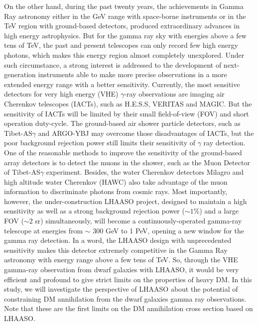 \documentclass[12pt,prd,showpacs,amsmath,amssymb,aps,floats,floatfix,nofootinbib]{revtex4-1}
\begin{document}
On the other hand, during the past twenty years, the achievements in Gamma Ray astronomy either in the GeV range with space-borne instruments or in the TeV region with ground-based detectors, produced extraordinary advances in high energy astrophysics. But for the gamma ray sky with energies above a few tens of TeV, the past and present telescopes can only record few high energy photons, which makes this energy region almost completely unexplored.
Under such circumstance, a strong interest is addressed to the development of next-generation instruments able to make more precise observations in a more extended energy range with a better sensitivity.
Currently, the most sensitive detectors for very high energy (VHE) $\gamma$-ray observations are imaging air Cherenkov telescopes (IACTs), such as H.E.S.S, VERITAS and MAGIC. But the sensitivity of IACTs will be limited by their small field-of-view (FOV) and short operation duty-cycle. The ground-based air shower particle detectors, such as Tibet-AS$\gamma$ and ARGO-YBJ may overcome those disadvantages of IACTs, but the poor background rejection power still limits their sensitivity of $\gamma$ ray detection. One of the reasonable methods to improve the sensitivity of the ground-based array detectors is to detect the muons in the shower, such as the Muon Detector of Tibet-AS$\gamma$ experiment. Besides, the water Cherenkov detectors Milagro and high altitude water Cherenkov (HAWC) also take advantage of the muon information to discriminate photons from cosmic rays.
Most importantly, however, the under-construction LHAASO project, designed to maintain a high sensitivity as well as a strong background rejection power ($\sim1\%$) and a large FOV ($\sim$2 sr) simultaneously, will become a continuously-operated gamma-ray telescope at energies from $\sim$ 300 GeV to 1 PeV, opening a new window for the gamma ray detection.
In a word, the LHAASO design with unprecedented sensitivity makes this detector extremely competitive in the Gamma Ray astronomy with energy range above a few tens of TeV.
So, through the VHE gamma-ray observation from dwarf galaxies with LHAASO, it would be very efficient and profound to give strict limits on the properties of heavy DM.
In this study, we will investigate the perspective of LHAASO about the potential of constraining DM annihilation from the dwarf galaxies gamma ray observations. Note that these are the first limits on the DM annihilation cross section based on LHAASO.
\end{document}
